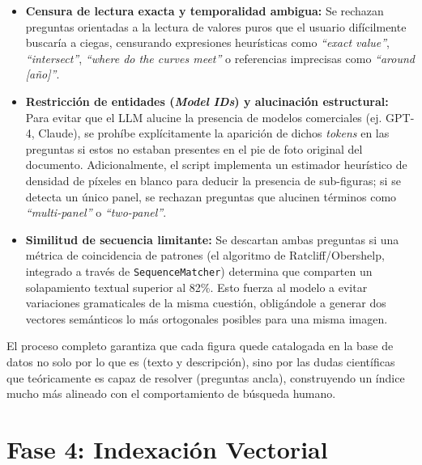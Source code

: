 \documentclass[a4paper]{report}
\begin{document}
\begin{itemize}
    \item \textbf{Censura de lectura exacta y temporalidad ambigua:} Se rechazan preguntas orientadas a la lectura de valores puros que el usuario difícilmente buscaría a ciegas, censurando expresiones heurísticas como \textit{``exact value''}, \textit{``intersect''}, \textit{``where do the curves meet''} o referencias imprecisas como \textit{``around [año]''}.
    \item \textbf{Restricción de entidades (\textit{Model IDs}) y alucinación estructural:} Para evitar que el LLM alucine la presencia de modelos comerciales (ej. GPT-4, Claude), se prohíbe explícitamente la aparición de dichos \textit{tokens} en las preguntas si estos no estaban presentes en el pie de foto original del documento. Adicionalmente, el script implementa un estimador heurístico de densidad de píxeles en blanco para deducir la presencia de sub-figuras; si se detecta un único panel, se rechazan preguntas que alucinen términos como \textit{``multi-panel''} o \textit{``two-panel''}.
    \item \textbf{Similitud de secuencia limitante:} Se descartan ambas preguntas si una métrica de coincidencia de patrones (el algoritmo de Ratcliff/Obershelp, integrado a través de \texttt{SequenceMatcher}) determina que comparten un solapamiento textual superior al 82\%. Esto fuerza al modelo a evitar variaciones gramaticales de la misma cuestión, obligándole a generar dos vectores semánticos lo más ortogonales posibles para una misma imagen.
\end{itemize}

El proceso completo garantiza que cada figura quede catalogada en la base de datos no solo por lo que es (texto y descripción), sino por las dudas científicas que teóricamente es capaz de resolver (preguntas ancla), construyendo un índice mucho más alineado con el comportamiento de búsqueda humano.

\begingroup
\let\clearpage\relax %
\let\newpage\relax   %
\vspace{0.5cm}       %

\section{Fase 4: Indexación Vectorial}
\label{sec:metodologia_indexacion}
\endgroup
\end{document}
